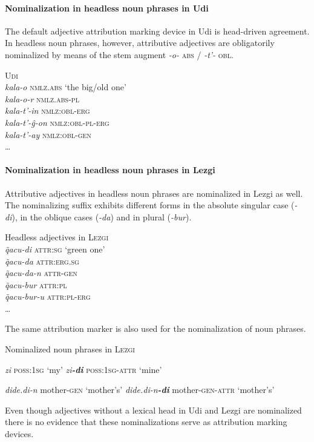 \paragraph{Nominalization in headless noun phrases in Udi}
The default adjective attribution marking device in Udi is head-driven agreement. In headless noun phrases, however, attributive adjectives are obligatorily nominalized by means of the stem augment \textit{-o-} \textsc{abs} / \textit{-t'-} \textsc{obl}.
\begin{exe}
\ex \textsc{Udi} \citep[466]{schulze-furhoff1994}\\
\textit{kala-o} \textsc{nmlz.abs} ‘the big/old one’\\
\textit{kala-o-r} \textsc{nmlz.abs}-\textsc{pl}\\
\textit{kala-t'-in} \textsc{nmlz:obl}-\textsc{erg}\\
\textit{kala-t'-ĝ-on} \textsc{nmlz:obl}-\textsc{pl}-\textsc{erg}\\
\textit{kala-t'-ay} \textsc{nmlz:obl}-\textsc{gen}\\
\dots
\end{exe}

\paragraph{Nominalization in headless noun phrases in Lezgi}
Attributive adjectives in headless noun phrases are nominalized in Lezgi as well. The nominalizing suffix exhibits different forms in the absolute singular case (\textit{-di}), in the oblique cases (\textit{-da}) and in plural (\textit{-bur}).
\begin{exe}
\ex Headless adjectives in \textsc{Lezgi} \citep[110]{haspelmath1993}\\
\textit{q̃acu-di} \textsc{attr:sg} ‘green one’\\
\textit{q̃acu-da} \textsc{attr:erg.sg}\\
\textit{q̃acu-da-n} \textsc{attr}-\textsc{gen}\\
\textit{q̃acu-bur} \textsc{attr:pl}\\
\textit{q̃acu-bur-u} \textsc{attr:pl}-\textsc{erg}\\
\dots
\end{exe}
The same attribution marker is also used for the nominalization of noun phrases.
\begin{exe}
\ex Nominalized noun phrases in \textsc{Lezgi} \citep[110]{haspelmath1993}
\begin{xlist}
\ex 
\begin{xlist}
\ex\textit{zi} \textsc{poss:1sg} ‘my’
\ex \textit{zi\textbf{-di}} \textsc{poss:1sg}-\textsc{attr} ‘mine’
\end{xlist}
\ex
\begin{xlist}
\ex \textit{dide.di-n} mother-\textsc{gen} ‘mother's’
\ex \textit{dide.di-n\textbf{-di}} mother-\textsc{gen}-\textsc{attr} ‘mother's’
\end{xlist}
\end{xlist}
\end{exe}
Even though adjectives without a lexical head in Udi and Lezgi are nominalized there is no evidence that these nominalizations serve as attribution marking devices.

